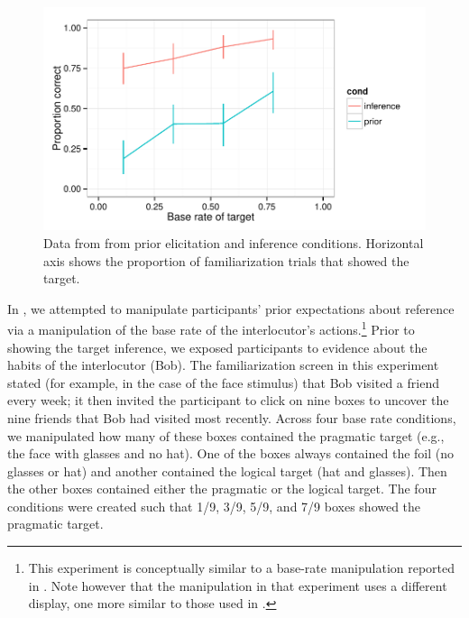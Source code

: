 \begin{figure}[t]
  \centering
  \includegraphics[width=5in]{../plots/2-prior-baserates.pdf}
  \caption{\label{fig:prior-baserate} Data from  from prior elicitation and inference conditions. Horizontal axis shows the proportion of familiarization trials that showed the target.}
\end{figure}

In , we attempted to manipulate participants' prior expectations about reference via a manipulation of the base rate of the interlocutor's actions.\footnote{This experiment is conceptually similar to a base-rate manipulation reported in . Note however that the manipulation in that experiment uses a different display, one more similar to those used in .} Prior to showing the target inference, we exposed participants to evidence about the habits of the interlocutor (Bob). The familiarization screen in this experiment stated (for example, in the case of the face stimulus) that Bob visited a friend every week; it then invited the participant to click on nine boxes to uncover the nine friends that Bob had visited most recently. Across four base rate conditions, we manipulated how many of these boxes contained the pragmatic target (e.g., the face with glasses and no hat). One of the boxes always contained the foil (no glasses or hat) and another contained the logical target (hat and glasses). Then the other boxes contained either the pragmatic or the logical target. The four conditions were created such that 1/9, 3/9, 5/9, and 7/9 boxes showed the pragmatic target. 

